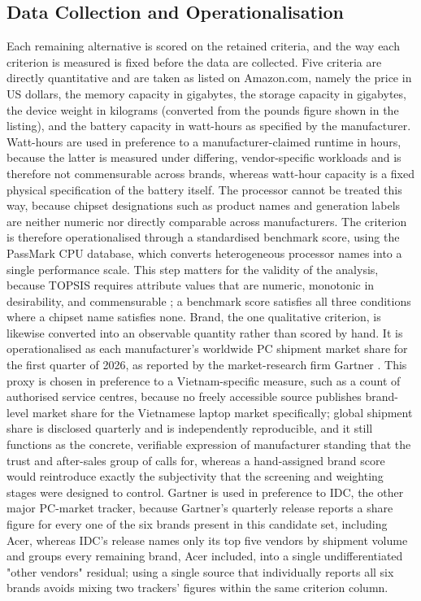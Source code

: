 \subsection{Data Collection and Operationalisation}\label{subsec:operationalisation}

Each remaining alternative is scored on the retained criteria, and the way each
criterion is measured is fixed before the data are collected. Five criteria are directly
quantitative and are taken as listed on Amazon.com, namely the price in US dollars, the
memory capacity in gigabytes, the storage capacity in gigabytes, the device weight in
kilograms (converted from the pounds figure shown in the listing), and the battery
capacity in watt-hours as specified by the manufacturer. Watt-hours are used in preference to a
manufacturer-claimed runtime in hours, because the latter is measured under differing,
vendor-specific workloads and is therefore not commensurable across brands, whereas
watt-hour capacity is a fixed physical specification of the battery itself. The processor
cannot be treated this way, because chipset designations such as product names and
generation labels are neither numeric nor directly comparable across manufacturers. The criterion is
therefore operationalised through a standardised benchmark score, using the PassMark CPU
database, which converts heterogeneous processor names into a single performance scale.
This step matters for the validity of the analysis, because TOPSIS requires attribute
values that are numeric, monotonic in desirability, and commensurable
\parencite{behzadian_state--art_2012}; a benchmark score satisfies all three conditions
where a chipset name satisfies none. Brand, the one qualitative criterion, is likewise
converted into an observable quantity rather than scored by hand. It is operationalised as
each manufacturer's worldwide PC shipment market share for the first quarter of 2026, as
reported by the market-research firm Gartner \parencite{gartner_2026}. This proxy is
chosen in preference to a Vietnam-specific measure, such as a count of authorised service
centres, because no freely accessible source publishes brand-level market share for the
Vietnamese laptop market specifically; global shipment share is disclosed quarterly and is
independently reproducible, and it still functions as the concrete, verifiable expression
of manufacturer standing that the trust and after-sales group of 
calls for, whereas a hand-assigned brand score would reintroduce exactly the subjectivity
that the screening and weighting stages were designed to control. Gartner is used in
preference to IDC, the other major PC-market tracker, because Gartner's quarterly release
reports a share figure for every one of the six brands present in this candidate set,
including Acer, whereas IDC's release names only its top five vendors by shipment volume
and groups every remaining brand, Acer included, into a single undifferentiated "other
vendors" residual; using a single source that individually reports all six brands avoids
mixing two trackers' figures within the same criterion column.


